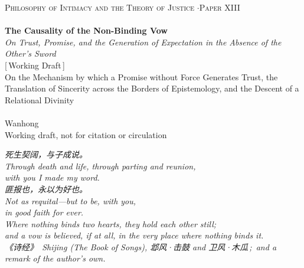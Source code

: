 \documentclass[11pt,a4paper]{article}
\begin{document}
\thispagestyle{empty}
\begin{center}
\vspace*{2cm}
{\footnotesize\color{rosedeep}\scshape Philosophy of Intimacy and the Theory of Justice \quad$\cdot$\quad Paper XIII}\\[0.3cm]
\coverrule\\[1.2cm]
{\LARGE\bfseries\color{warnred} The Causality of the Non-Binding Vow}\\[0.8cm]
{\large\itshape\color{warnred} On Trust, Promise, and the Generation of Expectation in the Absence of the Other's Sword}\\[0.8cm]
{\small\color{gold} [\,Working Draft\,]}\\[0.8cm]
{\normalsize\color{inksoft} On the Mechanism by which a Promise without Force Generates Trust, the Translation of Sincerity across the Borders of Epistemology, and the Descent of a Relational Divinity}\\[2cm]
\coverrule[0.25]\\[0.6cm]
{\normalsize\color{inksoft} Wanhong}\\
\vfill
{\footnotesize\color{gold} Working draft, not for citation or circulation}
\coverfootnote
\end{center}
\newpage

\thispagestyle{empty}
\vspace*{2.4cm}
\begin{center}
\begin{minipage}{0.76\linewidth}
\centering\itshape\color{rose}
{\cjk 死生契阔，与子成说。}\\[0.3em]
Through death and life, through parting and reunion,\\with you I made my word.\\[0.8em]
{\cjk 匪报也，永以为好也。}\\[0.3em]
Not as requital---but to be, with you,\\in good faith for ever.\\[0.8em]
\upshape Where nothing binds two hearts, they hold each other still;\\and a vow is believed, if at all, in the very place where nothing binds it.\\[0.6em]
{\upshape\footnotesize\color{gold} {\cjk《诗经》}\ \emph{Shijing} (The Book of Songs), {\cjk 邶风·击鼓} and {\cjk 卫风·木瓜}\,;\ and a remark of the author's own.}
\end{minipage}
\end{center}
\newpage
\end{document}
